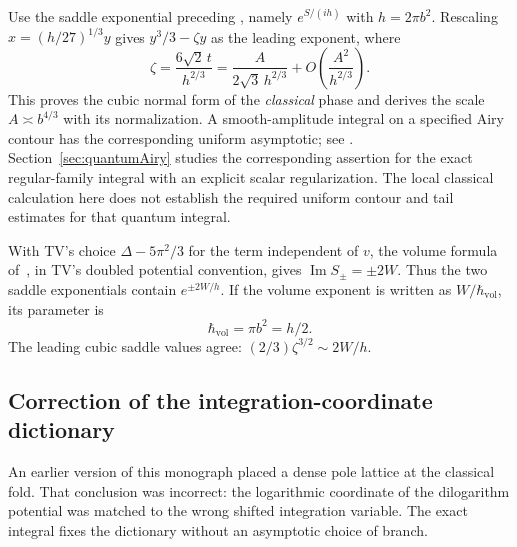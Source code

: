Use the saddle exponential preceding
\cite[eq.~(3.11)]{TeschnerVartanov}, namely $e^{S/(ih)}$
with $h=2\pi b^2$. Rescaling $x=(h/27)^{1/3}y$ gives
$y^3/3-\zeta y$ as the leading exponent, where
\begin{equation}
 \boxed{\quad
 \zeta=\frac{6\sqrt2\,t}{h^{2/3}}
       =\frac{A}{2\sqrt3\,h^{2/3}}
          +O\left(\frac{A^2}{h^{2/3}}\right).
 \quad}
 \label{eq:regularAiryvariable}
\end{equation}
This proves the cubic normal form of the \emph{classical}
phase and derives the scale $A\asymp b^{4/3}$ with its
normalization. A smooth-amplitude integral on a specified
Airy contour has the corresponding uniform asymptotic; see
\cite[Section~36.12]{DLMF}. Section~\ref{sec:quantumAiry}
studies the corresponding assertion for the exact regular-family
integral with an explicit scalar regularization. The local
classical calculation here does not establish the required
uniform contour and tail estimates for that quantum integral.

With TV's choice $\Delta-5\pi^2/3$ for the term independent of
$v$, the volume formula of~\cite{MurakamiYano}, in TV's doubled
potential convention, gives
$\operatorname{Im}S_\pm=\pm2W$. Thus the two saddle
exponentials contain $e^{\pm2W/h}$. If the volume exponent
is written as $W/\hbar_{\mathrm{vol}}$, its parameter is
\begin{equation}
 \hbar_{\mathrm{vol}}=\pi b^2=h/2.
 \label{eq:TVvolumehbar}
\end{equation}
The leading cubic saddle values agree:
$(2/3)\zeta^{3/2}\sim2W/h$.

\subsection{Correction of the integration-coordinate dictionary}

An earlier version of this monograph placed a dense pole lattice at the
classical fold. That conclusion was incorrect: the logarithmic coordinate
of the dilogarithm potential was matched to the wrong shifted integration
variable. The exact integral fixes the dictionary without an asymptotic
choice of branch.

